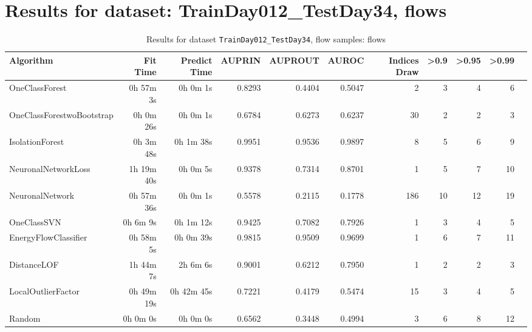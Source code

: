 \documentclass{article}
\begin{document}
\section*{Results for dataset: TrainDay012_TestDay34, flows}
\begin{table}[h!]
\centering
\caption{Results for dataset \texttt{TrainDay012_TestDay34}, flow samples: flows}
\label{tab:trainday012testday34_flows}
\begin{tabular}{lrrrrrrrrrr}
\toprule
Algorithm & Fit Time & Predict Time & AUPRIN & AUPROUT & AUROC & Indices Draw & >0.9 & >0.95 & >0.99 \\
\midrule
OneClassForest & 0h 57m 3s & 0h 0m 1s & 0.8293 & 0.4404 & 0.5047 & 2 & 3 & 4 & 6 \\
OneClassForestwoBootstrap & 0h 0m 26s & 0h 0m 1s & 0.6784 & 0.6273 & 0.6237 & 30 & 2 & 2 & 3 \\
IsolationForest & 0h 3m 48s & 0h 1m 38s & 0.9951 & 0.9536 & 0.9897 & 8 & 5 & 6 & 9 \\
NeuronalNetworkLoss & 1h 19m 40s & 0h 0m 5s & 0.9378 & 0.7314 & 0.8701 & 1 & 5 & 7 & 10 \\
NeuronalNetwork & 0h 57m 36s & 0h 0m 1s & 0.5578 & 0.2115 & 0.1778 & 186 & 10 & 12 & 19 \\
OneClassSVN & 0h 6m 9s & 0h 1m 12s & 0.9425 & 0.7082 & 0.7926 & 1 & 3 & 4 & 5 \\
EnergyFlowClassifier & 0h 58m 5s & 0h 0m 39s & 0.9815 & 0.9509 & 0.9699 & 1 & 6 & 7 & 11 \\
DistanceLOF & 1h 44m 7s & 2h 6m 6s & 0.9001 & 0.6212 & 0.7950 & 1 & 2 & 2 & 3 \\
LocalOutlierFactor & 0h 49m 19s & 0h 42m 45s & 0.7221 & 0.4179 & 0.5474 & 15 & 3 & 4 & 5 \\
Random & 0h 0m 0s & 0h 0m 0s & 0.6562 & 0.3448 & 0.4994 & 3 & 6 & 8 & 12 \\
\bottomrule
\end{tabular}
\end{table}
\end{document}
